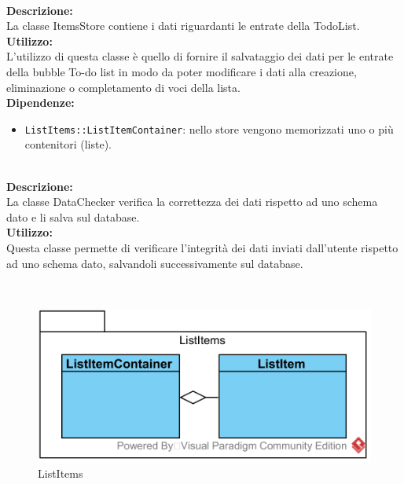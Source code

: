 \label{todo-itemsstore}\mbox{}\\
\textbf{Descrizione:}\\
La classe ItemsStore contiene i dati riguardanti le entrate della TodoList.\\
\textbf{Utilizzo:}\\
L'utilizzo di questa classe è quello di fornire il salvataggio dei dati per le entrate della bubble To-do list in modo da poter modificare i dati alla creazione, eliminazione o completamento di voci della lista.\\
\textbf{Dipendenze:}
\begin{itemize}
	\item \texttt{ListItems::ListItemContainer}: nello store vengono memorizzati uno o più contenitori (liste).
\end{itemize}

\label{todo-datachecker}\mbox{}\\
\textbf{Descrizione:}\\
La classe DataChecker verifica la correttezza dei dati rispetto ad uno schema dato e li salva sul database.\\
\textbf{Utilizzo:}\\
Questa classe permette di verificare l'integrità dei dati inviati dall'utente rispetto ad uno schema dato, salvandoli successivamente sul database.

\mbox{}\\ \label{todo-item-model}
\begin{figure}[H]
	\centering
	\includegraphics[width=14cm]{../../documenti/SpecificaTecnica/diagrammi_img/classi_e_package/todo_listitems.png}
	\caption{List\-Items}
\end{figure}

